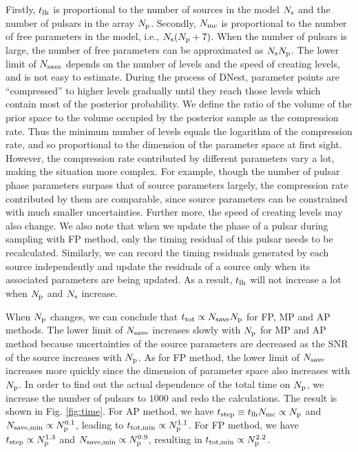 \documentclass[times,tight]{aastex631}
\begin{document}
Firstly, $t_{\rm lh}$ is proportional to the number of sources in the model $N_{\rm s}$ and the number of pulsars in the array $N_{\rm p}$.
Secondly, $N_{\rm mc}$ is proportional to the number of free parameters in the model, i.e., $N_{\rm s}(N_{\rm p}+7)$. When the number of pulsars is large, the number of free parameters can be approximated as $N_{\rm s}N_{\rm p}$.
The lower limit of $N_{\rm save}$ depends on the number of levels and the speed of creating levels, and is not easy to estimate.
During the process of DNest, parameter points are ``compressed'' to higher levels gradually until they reach those levels which contain most of the posterior probability.
We define the ratio of the volume of the prior space to the volume occupied by the posterior sample as the compression rate.
Thus the minimum number of levels equals the logarithm of the compression rate, and so proportional to the dimension of the parameter space at first sight.
However, the compression rate contributed by different parameters vary a lot, making the situation more complex.
For example, though the number of pulsar phase parameters surpass that of source parameters largely, the compression rate contributed by them are comparable, since source parameters can be constrained with much smaller uncertainties.
Further more, the speed of creating levels may also change.
We also note that when we update the phase of a pulsar during sampling with FP method, only the timing residual of this pulsar needs to be recalculated.
Similarly, we can record the timing residuals generated by each source independently and update the residuals of a source only when its associated parameters are being updated.
As a result, $t_{\rm lh}$ will not increase a lot when $N_{\rm p}$ and $N_{\rm s}$ increase.

When $N_{\rm p}$ changes, we can conclude that $t_{\rm tot} \propto N_{\rm save} N_{\rm p}$ for FP, MP and AP methods.
The lower limit of $N_{\rm save}$ increases slowly with $N_{\rm p}$ for MP and AP method because uncertainties of the source parameters are decreased as the SNR of the source increases with $N_{\rm p}$.
As for FP method, the lower limit of $N_{\rm save}$ increases more quickly since the dimension of parameter space also increases with $N_{\rm p}$.
In order to find out the actual dependence of the total time on $N_{\rm p}$, we increase the number of pulsars to $1000$ and redo the calculations.
The result is shown in Fig. \ref{fig:time}.
For AP method, we have $t_{\rm step} \equiv t_{\rm lh} N_{\rm mc} \propto N_{\rm p}$ and $N_{\rm save, min} \propto N_{\rm p}^{0.1}$, leading to $t_{\rm tot, min} \propto N_{\rm p}^{1.1}$.
For FP method, we have $t_{\rm step} \propto N_{\rm p}^{1.3}$ and $N_{\rm save, min} \propto N_{\rm p}^{0.9}$, resulting in $t_{\rm tot, min} \propto N_{\rm p}^{2.2}$.
\end{document}
